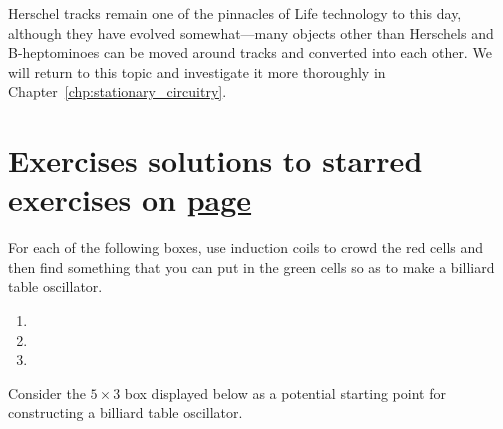 Herschel tracks remain one of the pinnacles of Life technology to this day, although they have evolved somewhat---many objects other than Herschels and B-heptominoes can be moved around tracks and converted into each other. We will return to this topic and investigate it more thoroughly in Chapter~\ref{chp:stationary_circuitry}.


\filbreak


\section*{Exercises \hfill \normalfont\textsf{\small solutions to starred exercises on \hyperlink{solutions_oscillators}{page \pageref{solutions_oscillators}}}}
\label{sec:oscillators_exercises}
\vspace*{-0.4cm}\hrulefill\vspace*{-0.3cm}\footnotesize\begin{multicols}{2}\vspace*{-0.4cm}\raggedcolumns{}
	\setlength{\parskip}{0pt}
	
	\begin{problemstar}\label{exer:billiard_tables}
		For each of the following boxes, use induction coils to crowd the red cells and then find something that you can put in the green cells so as to make a billiard table oscillator.\vspace*{-0.25cm}
		
		\begin{multicols}{2}
			\begin{enumerate}
				\item[\bf\color{ocre}(a)] 
				
				\item[\bf\color{ocre}(c)] 
				
				\item[\bf\color{ocre}(b)] 
			\end{enumerate}
		\end{multicols}
	\end{problemstar}
	
	
	\mfilbreak
	
	
	\begin{problem}\label{exer:billiard_table_5x3}
		Consider the $5 \times 3$ box displayed below as a potential starting point for constructing a billiard table oscillator.
		

\end{problem}
\end{multicols}
